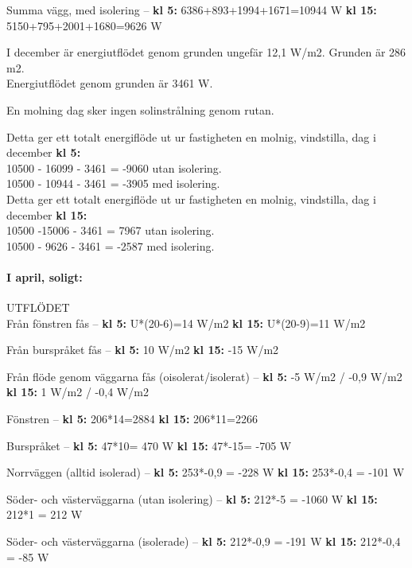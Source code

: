 Summa vägg, med isolering –
\textbf{kl 5:} 6386+893+1994+1671=10944 W
\textbf{kl 15:} 5150+795+2001+1680=9626 W

I december är energiutflödet genom grunden ungefär 12,1 W/m2. Grunden är 286 m2.\\
Energiutflödet genom grunden är 3461 W.

En molning dag sker ingen solinstrålning genom rutan.

Detta ger ett totalt energiflöde ut ur fastigheten en molnig, vindstilla, dag i december \textbf{kl 5:}\\
10500 - 16099 - 3461 = -9060 utan isolering.\\
10500 - 10944 - 3461 = -3905 med isolering.\\

Detta ger ett totalt energiflöde ut ur fastigheten en molnig, vindstilla, dag i december \textbf{kl 15:}\\
10500 -15006 - 3461 = 7967 utan isolering.\\
10500 - 9626 - 3461 = -2587 med isolering.\\


\paragraph{I april, soligt:}
UTFLÖDET\\

Från fönstren fås –
\textbf{kl 5:} U*(20-6)=14 W/m2
\textbf{kl 15:} U*(20-9)=11 W/m2

Från burspråket fås –
\textbf{kl 5:} 10 W/m2
\textbf{kl 15:} -15 W/m2

Från flöde genom väggarna fås (oisolerat/isolerat) –
\textbf{kl 5:} -5 W/m2 / -0,9 W/m2
\textbf{kl 15:} 1 W/m2 / -0,4 W/m2


Fönstren –
\textbf{kl 5:} 206*14=2884
\textbf{kl 15:} 206*11=2266

Burspråket – 
\textbf{kl 5:} 47*10= 470 W
\textbf{kl 15:} 47*-15= -705 W

Norrväggen (alltid isolerad) –
\textbf{kl 5:} 253*-0,9 = -228 W
\textbf{kl 15:} 253*-0,4 = -101 W

Söder- och västerväggarna (utan isolering) –
\textbf{kl 5:} 212*-5 = -1060 W
\textbf{kl 15:} 212*1 = 212 W

Söder- och västerväggarna (isolerade) –
\textbf{kl 5:} 212*-0,9 = -191 W
\textbf{kl 15:} 212*-0,4 = -85 W

